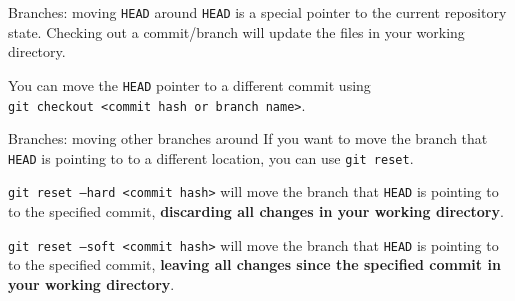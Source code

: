 \documentclass{beeper}
\begin{document}
\begin{frame}{Branches: moving \texttt{HEAD} around}
    \texttt{HEAD} is a special pointer to the current repository state.
    Checking out a commit/branch will update the files in your working
    directory.

    You can move the \texttt{HEAD} pointer to a different commit using\\
    \texttt{git checkout <commit hash or branch name>}.

\end{frame}

\begin{frame}{Branches: moving other branches around}
    If you want to move the branch that \texttt{HEAD} is pointing to to a
    different location, you can use \texttt{git reset}.
    \pause

    \texttt{git reset --hard <commit hash>} will move the branch that \texttt{HEAD}
    is pointing to to the specified commit, \textbf{discarding all changes in
    your working directory}.
    \pause

    \texttt{git reset --soft <commit hash>} will move the branch that
    \texttt{HEAD} is pointing to to the specified commit, \textbf{leaving all
    changes since the specified commit in your working directory}.
\end{frame}
\end{document}
